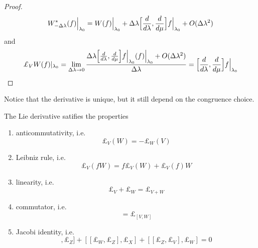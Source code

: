 \begin{proof}
\begin{equation*}
            W^*_{-\Delta\lambda} (f) \Big \vert_{\lambda_0} = W(f) \Big \vert_{\lambda_0} + \Delta \lambda \Big [\frac{d}{d\lambda}, \frac{d}{d\mu} \Big ] f \Big \vert_{\lambda_0} + O(\Delta \lambda^2) 
        \end{equation*}
        and 
        \begin{equation*}
            \pounds_V W(f) \vert_{\lambda_0} = \lim_{\Delta \lambda \rightarrow 0} \frac{\Delta \lambda \Big [\dv{}{\lambda}, \dv{}{\mu} \Big ] f \Big \vert_{\lambda_0} (f) \Big \vert_{\lambda_0} + O(\Delta \lambda^2) }{\Delta \lambda} = \Big [\dv{}{\lambda}, \dv{}{\mu} \Big ] f \Big \vert_{\lambda_0}
        \end{equation*}
    \end{proof}

    Notice that the derivative is unique, but it still depend on the congruence choice. 

    The Lie derivative satifies the properties 
    \begin{enumerate}
        \item anticommutativity, i.e. 
            \begin{equation*}
                \pounds_V (W) = - \pounds_W (V) 
            \end{equation*}
        \item Leibniz rule, i.e. 
            \begin{equation}\label{leib}
                \pounds_V (fW) = f \pounds_V (W) + \pounds_V (f) W  
            \end{equation}
        \item linearity, i.e.
            \begin{equation*}
                \pounds_V + \pounds_W = \pounds_{V+W}
            \end{equation*}
        \item commutator, i.e.
            \begin{equation*}
                [\pounds_V, \pounds_W] = \pounds_{[V,W]}
            \end{equation*}
        \item Jacobi identity, i.e.
            \begin{equation*}
                [[\pounds_V, \pounds_W], \pounds_Z] + [[\pounds_W, \pounds_Z], \pounds_X] + [[\pounds_Z, \pounds_V], \pounds_W] = 0 
            \end{equation*}
    \end{enumerate}

